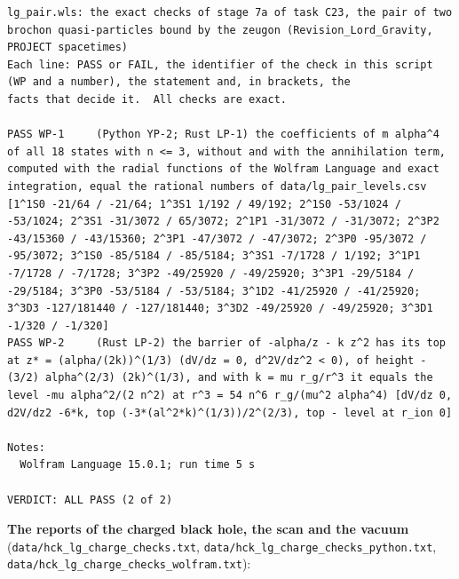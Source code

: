 \documentclass[
  10pt,
]{article}
\begin{document}
\begin{verbatim}
lg_pair.wls: the exact checks of stage 7a of task C23, the pair of two brochon quasi-particles bound by the zeugon (Revision_Lord_Gravity, PROJECT spacetimes)
Each line: PASS or FAIL, the identifier of the check in this script (WP and a number), the statement and, in brackets, the
facts that decide it.  All checks are exact.

PASS WP-1     (Python YP-2; Rust LP-1) the coefficients of m alpha^4 of all 18 states with n <= 3, without and with the annihilation term, computed with the radial functions of the Wolfram Language and exact integration, equal the rational numbers of data/lg_pair_levels.csv [1^1S0 -21/64 / -21/64; 1^3S1 1/192 / 49/192; 2^1S0 -53/1024 / -53/1024; 2^3S1 -31/3072 / 65/3072; 2^1P1 -31/3072 / -31/3072; 2^3P2 -43/15360 / -43/15360; 2^3P1 -47/3072 / -47/3072; 2^3P0 -95/3072 / -95/3072; 3^1S0 -85/5184 / -85/5184; 3^3S1 -7/1728 / 1/192; 3^1P1 -7/1728 / -7/1728; 3^3P2 -49/25920 / -49/25920; 3^3P1 -29/5184 / -29/5184; 3^3P0 -53/5184 / -53/5184; 3^1D2 -41/25920 / -41/25920; 3^3D3 -127/181440 / -127/181440; 3^3D2 -49/25920 / -49/25920; 3^3D1 -1/320 / -1/320]
PASS WP-2     (Rust LP-2) the barrier of -alpha/z - k z^2 has its top at z* = (alpha/(2k))^(1/3) (dV/dz = 0, d^2V/dz^2 < 0), of height -(3/2) alpha^(2/3) (2k)^(1/3), and with k = mu r_g/r^3 it equals the level -mu alpha^2/(2 n^2) at r^3 = 54 n^6 r_g/(mu^2 alpha^4) [dV/dz 0, d2V/dz2 -6*k, top (-3*(al^2*k)^(1/3))/2^(2/3), top - level at r_ion 0]

Notes:
  Wolfram Language 15.0.1; run time 5 s

VERDICT: ALL PASS (2 of 2)
\end{verbatim}

\textbf{The reports of the charged black hole, the scan and the vacuum}
(\texttt{data/hck\_lg\_charge\_checks.txt},
\texttt{data/hck\_lg\_charge\_checks\_python.txt},
\texttt{data/hck\_lg\_charge\_checks\_wolfram.txt}):
\end{document}
